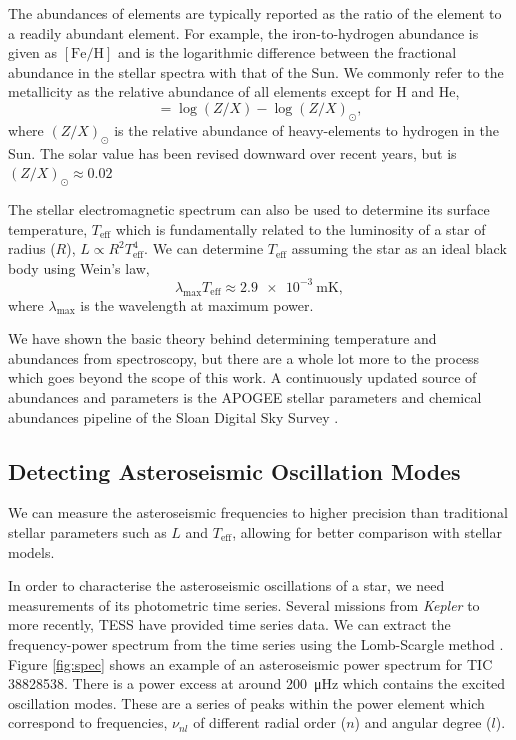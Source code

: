 The abundances of elements are typically reported as the ratio of the element to a readily abundant element. For example, the iron-to-hydrogen abundance is given as $[\mathrm{Fe/H}]$ and is the logarithmic difference between the fractional abundance in the stellar spectra with that of the Sun. We commonly refer to the metallicity as the relative abundance of all elements except for H and He,
\begin{equation}
    [\mathrm{M/H}] = \log(Z/X) - \log(Z/X)_\odot,
\end{equation}
where $(Z/X)_\odot$ is the relative abundance of heavy-elements to hydrogen in the Sun. The solar value has been revised downward over recent years, but is $(Z/X)_\odot \approx 0.02$ \citep{Grevesse.Sauval1998, Asplund.Grevesse.ea2005, Asplund.Grevesse.ea2009}

The stellar electromagnetic spectrum can also be used to determine its surface temperature, $T_\mathrm{eff}$ which is fundamentally related to the luminosity of a star of radius ($R$), $L \propto R^2T_\mathrm{eff}^4$. We can determine $T_\mathrm{eff}$ assuming the star as an ideal black body using Wein's law,
\begin{equation}
    \lambda_\mathrm{max} T_\mathrm{eff} \approx \SI{2.9e-3}{\meter\kelvin},
\end{equation}
where $\lambda_\mathrm{max}$ is the wavelength at maximum power.

We have shown the basic theory behind determining temperature and abundances from spectroscopy, but there are a whole lot more to the process which goes beyond the scope of this work. A continuously updated source of abundances and parameters is the APOGEE stellar parameters and chemical abundances pipeline \citep[ASPCAP;][]{GarciaPerez.AllendePrieto.ea2016} of the Sloan Digital Sky Survey \citep[SDSS;][]{Blanton.Bershady.ea2017}.

\subsection{Detecting Asteroseismic Oscillation Modes}\label{sec:astero-obs}

We can measure the asteroseismic frequencies to higher precision than traditional stellar parameters such as $L$ and $T_\mathrm{eff}$, allowing for better comparison with stellar models.

In order to characterise the asteroseismic oscillations of a star, we need measurements of its photometric time series. Several missions from \emph{Kepler} \citep{Borucki.Koch.ea2010} to more recently, TESS \citep{Ricker.Winn.ea2015} have provided time series data. We can extract the frequency-power spectrum from the time series using the Lomb-Scargle method \citep{Lomb1976, Scargle1982}. Figure \ref{fig:spec} shows an example of an asteroseismic power spectrum for TIC 38828538. There is a power excess at around \SI{200}{\micro\hertz} which contains the excited oscillation modes. These are a series of peaks within the power element which correspond to frequencies, $\nu_{nl}$ of different radial order ($n$) and angular degree ($l$).

